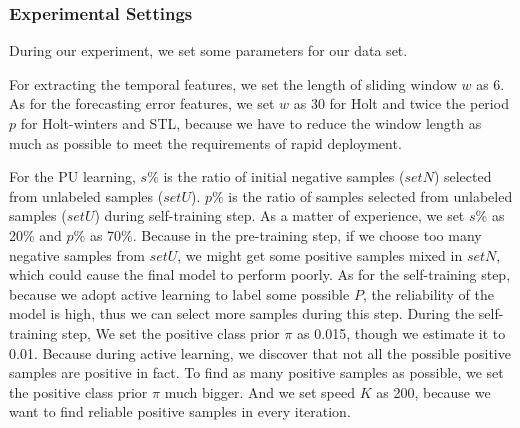 \subsubsection{Experimental Settings}
\label{Experimental settings}
\par
During our experiment, we set some parameters for our data set.
\par
For extracting the temporal features, we set the length of sliding window $w$ as 6. As for the forecasting error features, we set $w$ as 30 for Holt and twice the period $p$ for Holt-winters and STL, because we have to reduce the window length as much as possible to meet the requirements of rapid deployment.
\par
For the PU learning, $s\%$ is the ratio of initial negative samples ($setN$) selected from unlabeled samples ($setU$). $p\%$ is the ratio of samples selected from unlabeled samples ($setU$) during self-training step. As a matter of experience, we set $s\%$ as 20\% and $p\%$ as 70\%. Because in the pre-training step, if we choose too many negative samples from $setU$, we might get some positive samples mixed in $setN$, which could cause the final model to perform poorly. As for the self-training step, because we adopt active learning to label some possible $P$, the reliability of the model is high, thus we can select more samples during this step. During the self-training step, We set the positive class prior $\pi$ as 0.015, though we estimate it to 0.01. Because during active learning, we discover that not all the possible positive samples are positive in fact. To find as many positive samples as possible, we set the positive class prior $\pi$ much bigger. And we set speed $K$ as 200, because we want to find reliable positive samples in every iteration.

